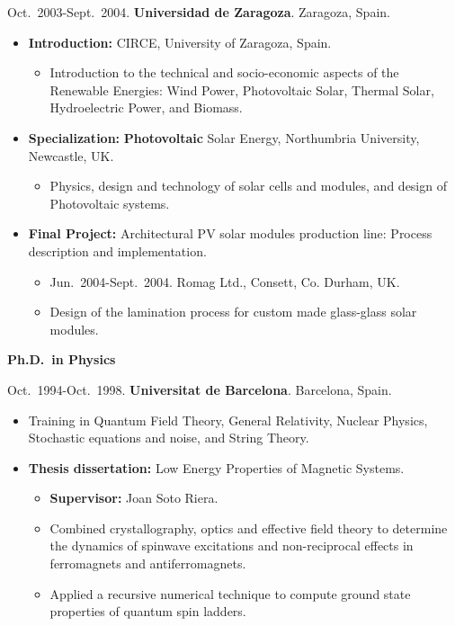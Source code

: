 \documentclass{article}
\begin{document}
\medskip
Oct.~2003-Sept.~2004. {\bf Universidad de Zaragoza}. Zaragoza, Spain.

\begin{itemize}\itemsep 0pt
\item {\bf Introduction:} CIRCE, University of Zaragoza, Spain.
\begin{itemize}
\item Introduction to the technical and socio-economic aspects of the Renewable Energies: Wind Power, Photovoltaic Solar, Thermal Solar, Hydroelectric Power, and Biomass.
\end{itemize}
\item {\bf Specialization:} {\bf Photovoltaic} Solar Energy, Northumbria University, Newcastle, UK.
\begin{itemize}
\item Physics, design and technology of solar cells and modules, and design of Photovoltaic systems.
\end{itemize}
\item {\bf Final Project:} Architectural PV solar modules production line: Process description and implementation.
\begin{itemize}
\item Jun.~2004-Sept.~2004. Romag Ltd., Consett, Co. Durham, UK.
\item Design of the lamination process for custom made glass-glass solar modules.
\end{itemize}
\end{itemize}



\medskip
{\bf Ph.D.\ in Physics}

\medskip
Oct.~1994-Oct.~1998. {\bf Universitat de Barcelona}. Barcelona, Spain.

\begin{itemize}\itemsep 0pt
\item Training in Quantum Field Theory, General Relativity, Nuclear Physics, 
Stochastic equations and noise, and String Theory.
\item {\bf Thesis dissertation:} Low Energy Properties of Magnetic Systems.
\begin{itemize}
\item {\bf Supervisor:} Joan Soto Riera.
\item Combined crystallography, optics and effective field theory to determine the dynamics of spinwave excitations and non-reciprocal effects in ferromagnets and antiferromagnets.
\item Applied a recursive numerical technique to compute ground state properties of quantum spin ladders.
\end{itemize}
\end{itemize}
\end{document}
